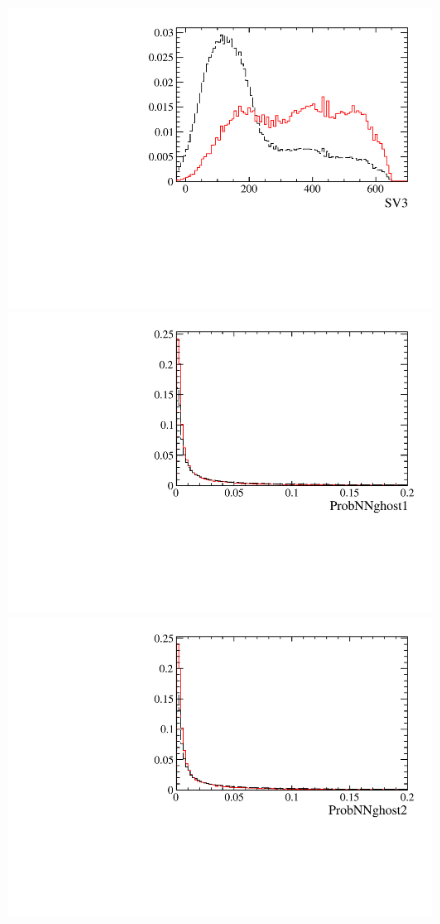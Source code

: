 \begin{figure} [htb!]
\begin{center}
\includegraphics[scale=0.20]{figs/SV3PARTIAL2pipi.pdf}
\includegraphics[scale=0.20]{figs/ProbNNghost1PARTIAL2pipi.pdf}
\includegraphics[scale=0.20]{figs/ProbNNghost2PARTIAL2pipi.pdf}

\end{center}
\end{figure}
